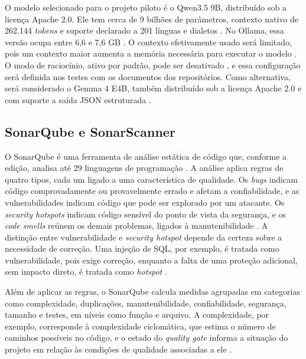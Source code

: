 O modelo selecionado para o projeto piloto é o Qwen3.5 9B, distribuído sob a licença Apache 2.0. Ele tem cerca de 9 bilhões de parâmetros, contexto nativo de 262.144 \textit{tokens} e suporte declarado a 201 línguas e dialetos \cite{qwen35Card}. No Ollama, essa versão ocupa entre 6,6 e 7,6 GB \cite{ollamaQwen35}. O contexto efetivamente usado será limitado, pois um contexto maior aumenta a memória necessária para executar o modelo \cite{ollamaContext}. O modo de raciocínio, ativo por padrão, pode ser desativado \cite{qwen35Card}, e essa configuração será definida nos testes com os documentos dos repositórios. Como alternativa, será considerado o Gemma 4 E4B, também distribuído sob a licença Apache 2.0 e com suporte a saída JSON estruturada \cite{gemma4Blog}.

\subsection{SonarQube e SonarScanner}
\label{st-sonar}

O SonarQube é uma ferramenta de análise estática de código que, conforme a edição, analisa até 29 linguagens de programação \cite{sonarAnalysis99}. A análise aplica regras de quatro tipos, cada um ligado a uma característica de qualidade. Os \textit{bugs} indicam código comprovadamente ou provavelmente errado e afetam a confiabilidade, e as vulnerabilidades indicam código que pode ser explorado por um atacante. Os \textit{security hotspots} indicam código sensível do ponto de vista da segurança, e os \textit{code smells} reúnem os demais problemas, ligados à manutenibilidade \cite{sonarRules99}. A distinção entre vulnerabilidade e \textit{security hotspot} depende da certeza sobre a necessidade de correção. Uma injeção de SQL, por exemplo, é tratada como vulnerabilidade, pois exige correção, enquanto a falta de uma proteção adicional, sem impacto direto, é tratada como \textit{hotspot} \cite{sonarSecurityRules99}.

Além de aplicar as regras, o SonarQube calcula medidas agrupadas em categorias como complexidade, duplicações, manutenibilidade, confiabilidade, segurança, tamanho e testes, em níveis como função e arquivo. A complexidade, por exemplo, corresponde à complexidade ciclomática, que estima o número de caminhos possíveis no código, e o estado do \textit{quality gate} informa a situação do projeto em relação às condições de qualidade associadas a ele \cite{sonarMetrics99}.

